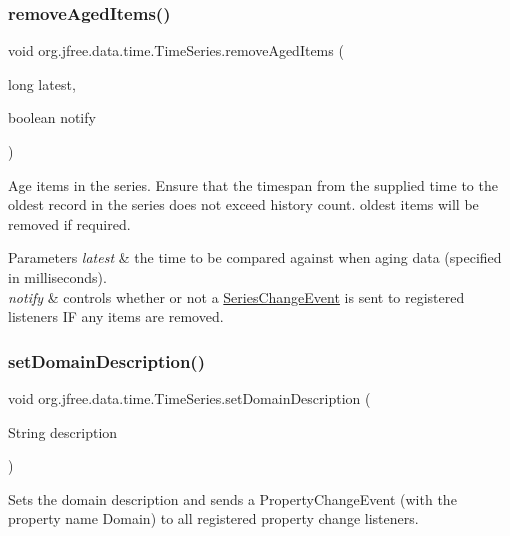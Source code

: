 \subsubsection{\texorpdfstring{remove\+Aged\+Items()}{removeAgedItems()}\hspace{0.1cm}{\footnotesize\ttfamily [2/2]}}
{\footnotesize\ttfamily void org.\+jfree.\+data.\+time.\+Time\+Series.\+remove\+Aged\+Items (\begin{DoxyParamCaption}\item[{long}]{latest,  }\item[{boolean}]{notify }\end{DoxyParamCaption})}

Age items in the series. Ensure that the timespan from the supplied time to the oldest record in the series does not exceed history count. oldest items will be removed if required.


\begin{DoxyParams}{Parameters}
{\em latest} & the time to be compared against when aging data (specified in milliseconds). \\
\hline
{\em notify} & controls whether or not a \mbox{\hyperlink{}{Series\+Change\+Event}} is sent to registered listeners IF any items are removed. \\
\hline
\end{DoxyParams}
\mbox{\label{classorg_1_1jfree_1_1data_1_1time_1_1_time_series_ad44fd7f203d6ba10a356a1bb55abbbc9}} 
\subsubsection{\texorpdfstring{set\+Domain\+Description()}{setDomainDescription()}}
{\footnotesize\ttfamily void org.\+jfree.\+data.\+time.\+Time\+Series.\+set\+Domain\+Description (\begin{DoxyParamCaption}\item[{String}]{description }\end{DoxyParamCaption})}

Sets the domain description and sends a {\ttfamily Property\+Change\+Event} (with the property name {\ttfamily Domain}) to all registered property change listeners.


